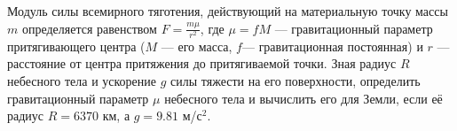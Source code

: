 Модуль силы всемирного тяготения, действующий на материальную точку
массы $m$ определяется равенством $F=\frac{m\mu}{r^2}$, где
$\mu=fM$ --- гравитационный параметр притягивающего центра ($M$ --- его
масса, $f$--- гравитационная постоянная) и $r$ --- расстояние от центра
притяжения до притягиваемой точки. Зная радиус $R$ небесного тела
и ускорение $g$ силы тяжести на его поверхности, определить
гравитационный параметр $\mu$ небесного тела и вычислить его
для Земли, если её радиус $R=6370$ км, а $g=9.81$ м/с$^2$.
